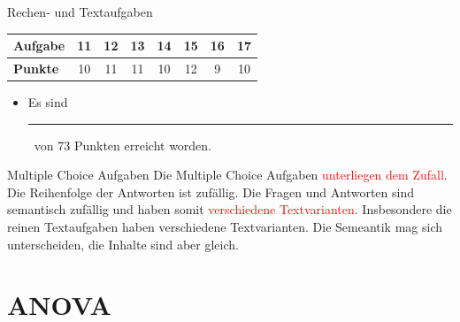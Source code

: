 \documentclass[a4paper, 9pt]{scrartcl}\usepackage[]{graphicx}\usepackage[]{xcolor}
\begin{document}
\begin{graybox}{Rechen- und Textaufgaben}
  \begin{center}
    \large
    \begin{tabular}{|l|c|c|c|c|c|c|c|}
      \hline
      \textbf{Aufgabe} & \textbf{11} & \textbf{12} & \textbf{13} & \textbf{14} & \textbf{15} & \textbf{16} & \textbf{17} \strut\\
      \hline
      \textbf{Punkte} & 
      \hspace{1Ex}\Large\textcolor{gray!70}{10}\hspace{1Ex}  & 
      \hspace{1Ex}\Large\textcolor{gray!70}{11}\hspace{1Ex}  & 
      \hspace{1Ex}\Large\textcolor{gray!70}{11}\hspace{1Ex}  & 
      \hspace{1Ex}\Large\textcolor{gray!70}{10}\hspace{1Ex}  & 
      \hspace{1Ex}\Large\textcolor{gray!70}{12}\hspace{1Ex}  & 
      \hspace{1Ex}\Large\textcolor{gray!70}{9}\hspace{1Ex}  & 
      \hspace{1Ex}\Large\textcolor{gray!70}{10}\hspace{1Ex} \strut\\
      \hline
  \end{tabular}
\end{center}
\begin{itemize}
\item Es sind \rule[0ex]{2em}{.4pt}\, von 73 Punkten erreicht worden.
\end{itemize}
\end{graybox}

\clearpage
\begin{graybox}{Multiple Choice Aufgaben}
Die Multiple Choice Aufgaben \textcolor{red}{unterliegen dem Zufall}. Die Reihenfolge der Antworten ist zufällig. Die Fragen und Antworten sind semantisch zufällig und haben somit \textcolor{red}{verschiedene Textvarianten}. Insbesondere die reinen Textaufgaben haben verschiedene Textvarianten. Die Semeantik mag sich unterscheiden, die Inhalte sind aber gleich.
\end{graybox}
\section*{ANOVA}
\end{document}
